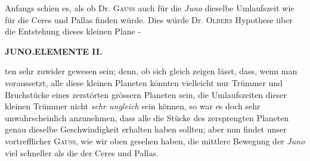 Anfangs schien es, als ob Dr. \textsc{Gauss} auch für die \emph{Juno} dieselbe Umlaufszeit wie für die Ceres und Pallas finden würde. Dies würde Dr. \textsc{Olbers} Hypothese über die Entstehung dieses kleinen Plane%
-\par
\clearpage
\endgroup
\begingroup
\pagestyle{empty}
\newcommand{\GaussVIGathering}[2]{%
  \fancypagestyle{gaussVIGathering}{%
    \fancyhf{}%
    \renewcommand{\headrulewidth}{0pt}%
    \renewcommand{\footrulewidth}{0pt}%
    \fancyfoot[C]{\makebox[\textwidth][l]{%
      \hspace*{.025\textwidth}{\footnotesize\bfseries #1}\hfill
      {\normalsize\bfseries\textls[90]{#2}}\hspace*{.18\textwidth}}}%
  }%
  \thispagestyle{gaussVIGathering}%
}
\thispagestyle{empty}
\noindent{}%
\makebox[12mm][l]{}%
\parbox[t]{\dimexpr\linewidth-24mm\relax}{\centering\footnotesize\bfseries JUNO.\enspace ELEMENTE II.\par}%
\par\nobreak\medskip
\noindent ten sehr zuwider gewesen sein; denn, ob sich gleich zeigen lässt, dass, wenn man voraussetzt, alle diese
kleinen Planeten könnten vielleicht nur Trümmer und Bruchstücke eines zerstörten grössern Planeten
sein, die Umlaufszeiten dieser kleinen Trümmer nicht \emph{sehr ungleich} sein können, so war es doch sehr
unwahrscheinlich anzunehmen, dass alle die Stücke des zersprengten Planeten genau dieselbe Geschwindigkeit erhalten haben sollten; aber nun findet unser vortrefflicher \textsc{Gauss}, wie wir oben gesehen haben,
die mittlere Bewegung der \emph{Juno} viel schneller als die der Ceres und Pallas.

